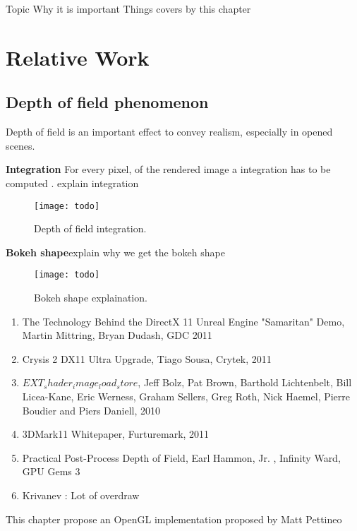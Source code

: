 Topic
Why it is important
Things covers by this chapter

\section{Relative Work}\label{Derousiers:RelativeWork}

\subsection{Depth of field phenomenon}
Depth of field is an important effect to convey realism, especially in opened scenes.

\textbf{Integration} For every pixel, of the rendered image a integration has to be computed . explain integration

	\begin{figure}[htb]\centering
	\texttt{[image: todo]}
	\caption{Depth of field integration.}
	\label{YourName:fig1}
	\end{figure}

\textbf{Bokeh shape}explain why we get the bokeh shape

	\begin{figure}[htb]\centering
	\texttt{[image: todo]}
	\caption{Bokeh shape explaination.}
	\label{YourName:fig1}
	\end{figure}

\begin{enumerate}
	\item The Technology Behind the DirectX 11 Unreal Engine "Samaritan" Demo, Martin Mittring, Bryan Dudash, GDC 2011
	\item Crysis 2 DX11 Ultra Upgrade, Tiago Sousa, Crytek, 2011
	\item $EXT_shader_image_load_store$, Jeff Bolz, Pat Brown, Barthold Lichtenbelt, Bill Licea-Kane, Eric Werness, Graham Sellers, Greg Roth, Nick Haemel, Pierre Boudier and Piers Daniell, 2010
	\item 3DMark11 Whitepaper, Furturemark, 2011
	\item Practical Post-Process Depth of Field, Earl Hammon, Jr. , Infinity Ward, GPU Gems 3
	\item Krivanev : Lot of overdraw
\end{enumerate}

	This chapter propose an OpenGL implementation proposed by Matt Pettineo~\cite{Pettineo11}

